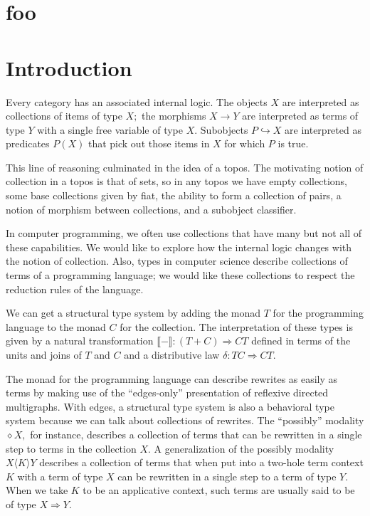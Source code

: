\documentclass[sigplan,9pt,review,anonymous]{acmart}\settopmatter{printfolios=true,printccs=false,printacmref=false}
\newcommand{\maps}{\colon}
\newcommand{\into}{\hookrightarrow}
\newcommand{\interp}[1]{\llbracket #1 \rrbracket}
\begin{document}
\section{foo}


\section{Introduction}
Every category has an associated internal logic.  The objects $X$ are interpreted as collections of items of type $X;$ the morphisms $X \to Y$ are interpreted as terms of type $Y$ with a single free variable of type $X.$  Subobjects $P \into X$ are interpreted as predicates $P(X)$ that pick out those items in $X$ for which $P$ is true.

This line of reasoning culminated in the idea of a topos.  The motivating notion of collection in a topos is that of sets, so in any topos we have empty collections, some base collections given by fiat, the ability to form a collection of pairs, a notion of morphism between collections, and a subobject classifier.

In computer programming, we often use collections that have many but not all of these capabilities.  We would like to explore how the internal logic changes with the notion of collection.  Also, types in computer science describe collections of terms of a programming language; we would like these collections to respect the reduction rules of the language.

We can get a structural type system by adding the monad $T$ for the programming language to the monad $C$ for the collection.  The interpretation of these types is given by a natural transformation ${\interp{-}\maps (T+C) \Rightarrow CT}$ defined in terms of the units and joins of $T$ and $C$ and a distributive law ${\delta\maps TC \Rightarrow CT}.$

The monad for the programming language can describe rewrites as easily as terms by making use of the ``edges-only'' presentation of reflexive directed multigraphs.  With edges, a structural type system is also a behavioral type system because we can talk about collections of rewrites.  The ``possibly'' modality $\diamond X,$ for instance, describes a collection of terms that can be rewritten in a single step to terms in the collection $X.$  A generalization of the possibly modality $X\langle K\rangle Y$ describes a collection of terms that when put into a two-hole term context $K$ with a term of type $X$ can be rewritten in a single step to a term of type $Y.$  When we take $K$ to be an applicative context, such terms are usually said to be of type $X \Rightarrow Y.$
\end{document}
